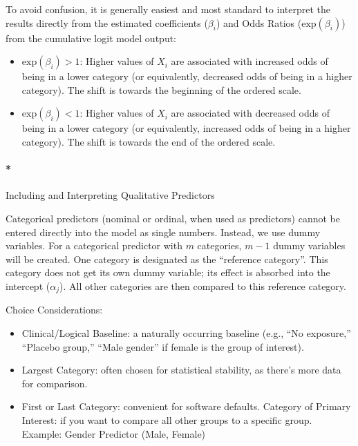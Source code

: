 \documentclass[
  letterpaper,
  DIV=11,
  numbers=noendperiod]{scrartcl}
\let\oldparagraph\paragraph
\renewcommand{\paragraph}[1]{\oldparagraph{#1}\mbox{}}
\begin{document}
To avoid confusion, it is generally easiest and most standard to
interpret the results directly from the estimated coefficients
(\(\beta_i\)) and Odds Ratios (\(\text{exp}(\beta_i)\)) from the
cumulative logit model output:

\begin{itemize}
\item
  \(\text{exp}(\beta_i)>1\): Higher values of \(X_i\) are associated
  with increased odds of being in a lower category (or equivalently,
  decreased odds of being in a higher category). The shift is towards
  the beginning of the ordered scale.
\item
  \(\text{exp}(\beta_i)<1\): Higher values of \(X_i\) are associated
  with decreased odds of being in a lower category (or equivalently,
  increased odds of being in a higher category). The shift is towards
  the end of the ordered scale.
\end{itemize}

\hypertarget{including-and-interpreting-qualitative-predictors}{%
\paragraph*{Including and Interpreting Qualitative
Predictors}\label{including-and-interpreting-qualitative-predictors}}

Categorical predictors (nominal or ordinal, when used as predictors)
cannot be entered directly into the model as single numbers. Instead, we
use dummy variables. For a categorical predictor with \(m\) categories,
\(m−1\) dummy variables will be created. One category is designated as
the ``reference category''. This category does not get its own dummy
variable; its effect is absorbed into the intercept (\(\alpha_j\)). All
other categories are then compared to this reference category.

Choice Considerations:

\begin{itemize}
\item
  Clinical/Logical Baseline: a naturally occurring baseline (e.g., ``No
  exposure,'' ``Placebo group,'' ``Male gender'' if female is the group
  of interest).
\item
  Largest Category: often chosen for statistical stability, as there's
  more data for comparison.
\item
  First or Last Category: convenient for software defaults. Category of
  Primary Interest: if you want to compare all other groups to a
  specific group. Example: Gender Predictor (Male, Female)
\end{itemize}
\end{document}
